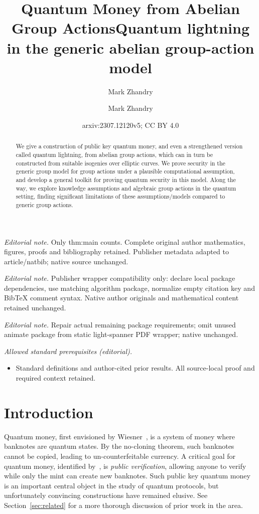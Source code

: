\documentclass{article}\usepackage[a4paper,margin=20mm]{geometry}
\title{Quantum Money from Abelian Group Actions}
\author{Mark Zhandry}\date{}
\title{Quantum lightning in the generic abelian group-action model}
\author{Mark Zhandry}
\date{arxiv:2307.12120v5; CC BY 4.0}
\numberwithin{theorem}{section}
\numberwithin{equation}{section}
\begin{document}
\maketitle
\noindent\textit{Editorial note.} Only thm:main counts. Complete original author mathematics, figures, proofs and bibliography retained. Publisher metadata adapted to article/natbib; native source unchanged.\par\medskip
\noindent\textit{Editorial note.} Publisher wrapper compatibility only: declare local package dependencies, use matching algorithm package, normalize empty citation key and BibTeX comment syntax. Native author originals and mathematical content retained unchanged.\par\medskip
\noindent\textit{Editorial note.} Repair actual remaining package requirements; omit unused animate package from static light-spanner PDF wrapper; native unchanged.\par\medskip
\noindent\textit{Allowed standard prerequisites (editorial).}\begin{itemize}
\item Standard definitions and author-cited prior results. All source-local proof and required context retained.
\end{itemize}\medskip

\maketitle

\begin{abstract}We give a construction of public key quantum money, and even a strengthened version called quantum lightning, from abelian group actions, which can in turn be constructed from suitable isogenies over elliptic curves. We prove security in the generic group model for group actions under a plausible computational assumption, and develop a general toolkit for proving quantum security in this model. Along the way, we explore knowledge assumptions and algebraic group actions in the quantum setting, finding significant limitations of these assumptions/models compared to generic group actions. 
\end{abstract}
	


\section{Introduction}\label{sec:intro}

Quantum money, first envisioned by Wiesner~\cite{Wiesner83}, is a system of money where banknotes are quantum states. By the no-cloning theorem, such banknotes cannot be copied, leading to un-counterfeitable currency. A critical goal for quantum money, identified by~\cite{CCC:Aaronson09}, is \emph{public verification}, allowing anyone to verify while only the mint can create new banknotes. Such public key quantum money is an important central object in the study of quantum protocols, but unfortunately convincing constructions have remained elusive. See Section~\ref{sec:related} for a more thorough discussion of prior work in the area.
\end{document}

